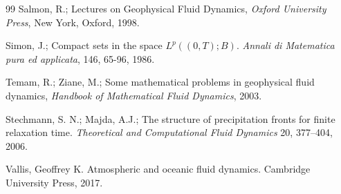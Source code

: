 \documentclass[11pt, a4paper, article,reqno,]{amsart}
\theoremstyle{remark}
\numberwithin{equation}{section}
\begin{document}
\begin{thebibliography}{99}
Salmon, R.; Lectures on Geophysical Fluid Dynamics, \textit{Oxford University Press}, New York, Oxford, 1998.


Simon, J.; Compact sets in the space $L^p((0,T); B)$. \textit{Annali di Matematica pura ed applicata}, 146, 65-96, 1986.

Temam, R.; Ziane, M.; Some mathematical problems in geophysical fluid dynamics, \textit{Handbook of Mathematical Fluid Dynamics}, 2003.


 Stechmann, S. N.; Majda, A.J.; The structure of precipitation fronts for finite relaxation time. \textit{Theoretical and Computational Fluid Dynamics} 20, 377--404, 2006.

 Vallis, Geoffrey K. Atmospheric and oceanic fluid dynamics. Cambridge University Press, 2017.





\end{thebibliography}
\end{document}
